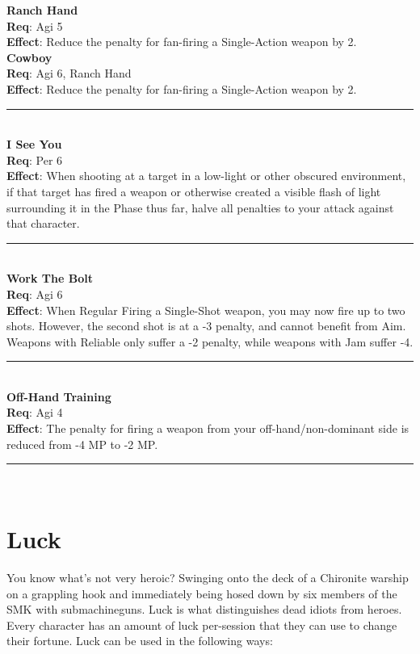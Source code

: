 \documentclass[a4paper, twocolumn, openany]{book}
\newlength{\indentlen}
\newcommand{\tabto}[1]{\setlength{\leftskip}{#1\indentlen}}
\begin{document}
{\tabto{0}
{\bfseries Ranch Hand}\\
{\bfseries Req}:  Agi 5\\
{\bfseries Effect}:  Reduce the penalty for fan-firing a Single-Action weapon by 2.\\

	\tabto{1}
	{\bfseries Cowboy}\\
	{\bfseries Req}:  Agi 6, Ranch Hand\\
	{\bfseries Effect}:  Reduce the penalty for fan-firing a Single-Action weapon by 2.\\ \hrule\ \\

\tabto{0}
{\bfseries I See You}\\
{\bfseries Req}:  Per 6\\
{\bfseries Effect}:  When shooting at a target in a low-light or other obscured environment, if that target has
fired a weapon or otherwise created a visible flash of light surrounding it in the Phase thus far,
halve all penalties to your attack against that character.\\ \hrule\ \\

{\bfseries Work The Bolt}\\
{\bfseries Req}: Agi 6\\
{\bfseries Effect}:  When Regular Firing a Single-Shot weapon, you may now fire up to two shots. However,
the second shot is at a -3 penalty, and cannot benefit from Aim. Weapons with Reliable only
suffer a -2 penalty, while weapons with Jam suffer -4.\\ \hrule\ \\

{\bfseries Off-Hand Training}\\
{\bfseries Req}: Agi 4\\
{\bfseries Effect}: The penalty for firing a weapon from your off-hand/non-dominant side is reduced from -4
MP to -2 MP.\\ \hrule\ \\

\newpage %

\section{Luck}

You know what’s not very heroic? Swinging onto the deck of a Chironite warship on a grappling
hook and immediately being hosed down by six members of the SMK with submachineguns.
Luck is what distinguishes dead idiots from heroes. Every character has an amount of luck
per-session that they can use to change their fortune. Luck can be used in the following ways:\\

}
\end{document}
